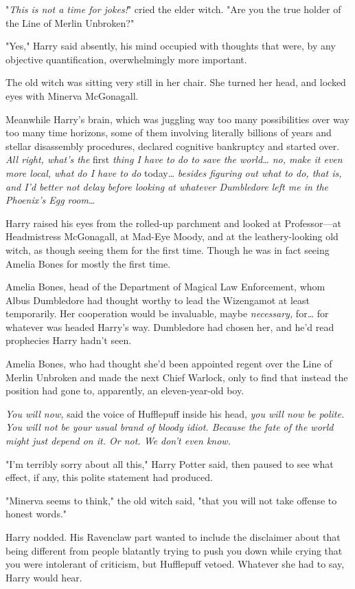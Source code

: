 "\emph{This is not a time for jokes!}" cried the elder witch. "Are you the true
holder of the Line of Merlin Unbroken?"

"Yes," Harry said absently, his mind occupied with thoughts that were, by any
objective quantification, overwhelmingly more important.

The old witch was sitting very still in her chair. She turned her head, and
locked eyes with Minerva McGonagall.

Meanwhile Harry's brain, which was juggling way too many possibilities over way
too many time horizons, some of them involving literally billions of years and
stellar disassembly procedures, declared cognitive bankruptcy and started over.
\emph{All right, what's the} first \emph{thing I have to do to save the
world{\ldots} no, make it even more local, what do I have to do} today{\ldots}
\emph{besides figuring out what to do, that is, and I'd better not delay before
looking at whatever Dumbledore left me in the Phoenix's Egg room{\ldots}}

Harry raised his eyes from the rolled-up parchment and looked at Professor---at
Headmistress McGonagall, at Mad-Eye Moody, and at the leathery-looking old
witch, as though seeing them for the first time. Though he was in fact seeing
Amelia Bones for mostly the first time.

Amelia Bones, head of the Department of Magical Law Enforcement, whom Albus
Dumbledore had thought worthy to lead the Wizengamot at least temporarily. Her
cooperation would be invaluable, maybe \emph{necessary,} for{\ldots} for
whatever was headed Harry's way. Dumbledore had chosen her, and he'd read
prophecies Harry hadn't seen.

Amelia Bones, who had thought she'd been appointed regent over the Line of
Merlin Unbroken and made the next Chief Warlock, only to find that instead the
position had gone to, apparently, an eleven-year-old boy.

\emph{You will now,} said the voice of Hufflepuff inside his head, \emph{you
will now be polite. You will not be your usual brand of bloody idiot. Because
the fate of the world might just depend on it. Or not. We don't even know.}

"I'm terribly sorry about all this," Harry Potter said, then paused to see what
effect, if any, this polite statement had produced.

"Minerva seems to think," the old witch said, "that you will not take offense
to honest words."

Harry nodded. His Ravenclaw part wanted to include the disclaimer about that
being different from people blatantly trying to push you down while crying that
you were intolerant of criticism, but Hufflepuff vetoed. Whatever she had to
say, Harry would hear.

